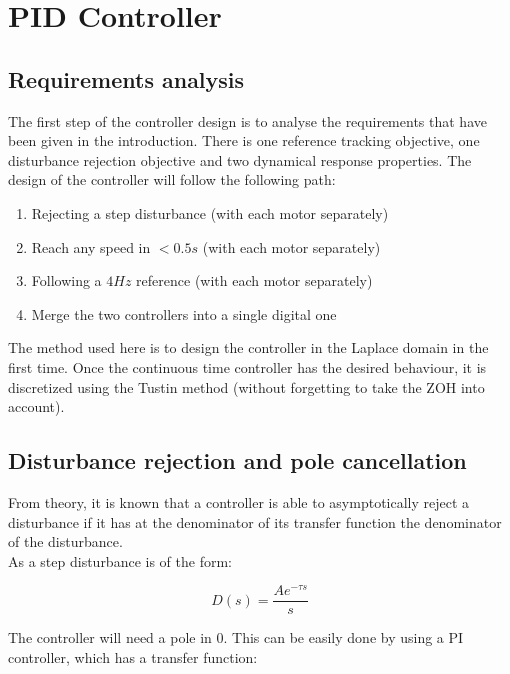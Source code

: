 \setcounter{secnumdepth}{1}

\chapter{PID Controller}
\label{section:PID controller}

\section{Requirements analysis}

The first step of the controller design is to analyse the requirements that have been given in the introduction. There is one reference tracking objective, one disturbance rejection objective and two dynamical response properties.
The design of the controller will follow the following path:

\begin{enumerate}
    \item Rejecting a step disturbance (with each motor separately)
    \item Reach any speed in $< 0.5 s$ (with each motor separately)
    \item Following a $4 Hz$ reference (with each motor separately)
    \item Merge the two controllers into a single digital one
\end{enumerate}

The method used here is to design the controller in the Laplace domain in the first time. Once the continuous time
controller has the desired behaviour, it is discretized using the Tustin method (without forgetting to take the
ZOH into account).

\section{Disturbance rejection and pole cancellation}

From theory, it is known that a controller is able to asymptotically reject a disturbance if it has at the denominator
of its transfer function the denominator of the disturbance.\\

As a step disturbance is of the form:

\begin{equation}
    D(s) = \frac{A e^{-\tau s}}{s}
\end{equation}

The controller will need a pole in $0$. This can be easily done by using a PI controller, which has a transfer function:

